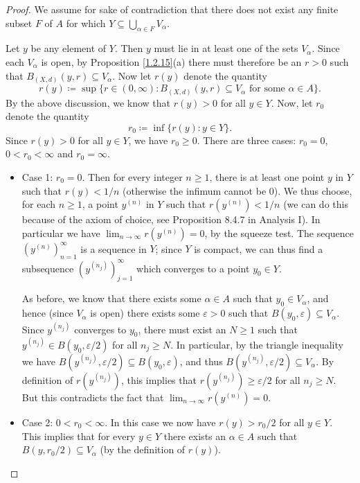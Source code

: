 \begin{proof}
    We assume for sake of contradiction that there does not exist any finite subset \(F\) of \(A\) for which \(Y \subseteq \bigcup_{\alpha \in F} V_{\alpha}\).

    Let \(y\) be any element of \(Y\).
    Then \(y\) must lie in at least one of the sets \(V_{\alpha}\).
    Since each \(V_{\alpha}\) is open, by Proposition \ref{1.2.15}(a) there must therefore be an \(r > 0\) such that \(B_{(X, d)}(y, r) \subseteq V_{\alpha}\).
    Now let \(r(y)\) denote the quantity
    \[
        r(y) \coloneqq \sup\{r \in (0, \infty) : B_{(X, d)}(y, r) \subseteq V_{\alpha} \text{ for some } \alpha \in A\}.
    \]
    By the above discussion, we know that \(r(y) > 0\) for all \(y \in Y\).
    Now, let \(r_0\) denote the quantity
    \[
        r_0 \coloneqq \inf\{r(y) : y \in Y\}.
    \]
    Since \(r(y) > 0\) for all \(y \in Y\), we have \(r_0 \geq 0\).
    There are three cases: \(r_0 = 0\), \(0 < r_0 < \infty\) and \(r_0 = \infty\).
    \begin{itemize}
        \item Case 1:
              \(r_0 = 0\).
              Then for every integer \(n \geq 1\), there is at least one point \(y\) in \(Y\) such that \(r(y) < 1 / n\) (otherwise the infimum cannot be \(0\)).
              We thus choose, for each \(n \geq 1\), a point \(y^{(n)}\) in \(Y\) such that \(r(y^{(n)}) < 1 / n\)
              (we can do this because of the axiom of choice, see Proposition 8.4.7 in Analysis I).
              In particular we have \(\lim_{n \to \infty} r(y^{(n)}) = 0\), by the squeeze test.
              The sequence \((y^{(n)})_{n = 1}^\infty\) is a sequence in \(Y\);
              since \(Y\) is compact, we can thus find a subsequence \((y^{(n_j)})_{j = 1}^\infty\) which converges to a point \(y_0 \in Y\).

              As before, we know that there exists some \(\alpha \in A\) such that \(y_0 \in V_{\alpha}\), and hence (since \(V_{\alpha}\) is open) there exists some \(\varepsilon > 0\) such that \(B(y_0, \varepsilon) \subseteq V_{\alpha}\).
              Since \(y^{(n_j)}\) converges to \(y_0\), there must exist an \(N \geq 1\) such that \(y^{(n_j)} \in B(y_0, \varepsilon / 2)\) for all \(n_j \geq N\).
              In particular, by the triangle inequality we have \(B(y^{(n_j)}, \varepsilon / 2) \subseteq B(y_0, \varepsilon)\), and thus \(B(y^{(n_j)}, \varepsilon / 2) \subseteq V_{\alpha}\).
              By definition of \(r(y^{(n_j)})\), this implies that \(r(y^{(n_j)}) \geq \varepsilon / 2\) for all \(n_j \geq N\).
              But this contradicts the fact that \(\lim_{n \to \infty} r(y^{(n)}) = 0\).
        \item Case 2:
              \(0 < r_0 < \infty\).
              In this case we now have \(r(y) > r_0 / 2\) for all \(y \in Y\).
              This implies that for every \(y \in Y\) there exists an \(\alpha \in A\) such that \(B(y, r_0 / 2) \subseteq V_{\alpha}\) (by the definition of \(r(y)\)).


\end{itemize}
\end{proof}
